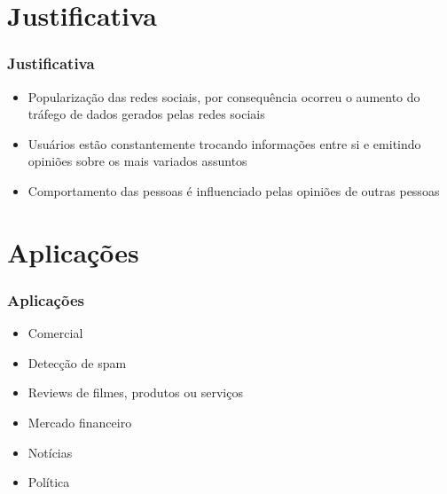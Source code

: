 \documentclass{beamer}
\begin{document}
\section{Justificativa}
\begin{frame}%
\frametitle{\textbf{Justificativa}\transdissolve}%
\begin{itemize}%
\item<1->Popularização das redes sociais, por consequência ocorreu o aumento do tráfego de dados gerados pelas redes sociais
\item<3->Usuários estão constantemente trocando informações entre si e emitindo opiniões sobre os mais variados assuntos
\item<4->Comportamento das pessoas é influenciado pelas opiniões de outras pessoas
\end{itemize}

\end{frame}

\section{Aplicações}
\begin{frame}%
\frametitle{\textbf{Aplicações}\transdissolve}%
\begin{itemize}%
\item<1->Comercial
\item<2->Detecção de spam
\item<3->Reviews de filmes, produtos ou serviços
\item<4->Mercado financeiro
\item<5->Notícias
\item<6->Política

\end{itemize}
\end{frame}
\end{document}
